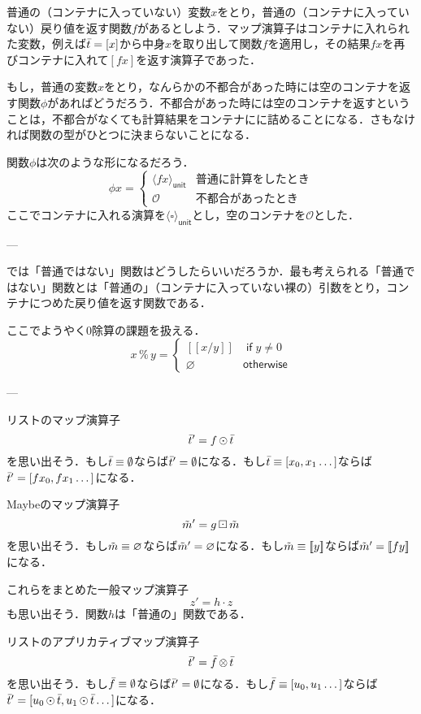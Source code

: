 \documentclass[a5paper,draft]{jsbook}
\def\[{\left[\!\left[}
\def\]{\right]\!\right]}
\newcommand{\mathListVar}[1]{\Bar{#1}}
\newcommand{\mathSomething}{\square}
\newcommand{\mathKeyword}[1]{\operatorname{\textsf{#1}}}
\newcommand{\mathIf}{\mathKeyword{if}}
\newcommand{\mathOtherwise}{\mathKeyword{otherwise}}
\DeclareMathOperator{\hsklApplicativeListMap}{\otimes}
\DeclareMathOperator{\hsklFmap}{\cdot}
\DeclareMathOperator{\hsklMap}{\odot}
\DeclareMathOperator{\hsklMaybeMap}{\boxdot}
\newcommand{\hsklEmptyList}{\emptyset}
\newcommand{\hsklNothing}{\varnothing}
\newcommand{\hsklJust}[1]{\[#1\]}
\newcommand{\hsklUnit}[1]{\langle#1\rangle_\textsf{unit}}
\newcommand{\hsklMaybe}[1]{\Tilde{#1}}
\begin{document}
普通の（コンテナに入っていない）変数$x$をとり，普通の（コンテナに入っていない）戻り値を返す関数$f$があるとしよう．マップ演算子はコンテナに入れられた変数，例えば$\mathListVar{t}=[x]$から中身$x$を取り出して関数$f$を適用し，その結果$fx$を再びコンテナに入れて$[fx]$を返す演算子であった．

もし，普通の変数$x$をとり，なんらかの不都合があった時には空のコンテナを返す関数$\phi$があればどうだろう．不都合があった時には空のコンテナを返すということは，不都合がなくても計算結果をコンテナにに詰めることになる．さもなければ関数の型がひとつに決まらないことになる．

関数$\phi$は次のような形になるだろう．
$$\phi x=\begin{cases}\hsklUnit{fx}&\text{普通に計算をしたとき}\\
\mathcal{O}&\text{不都合があったとき}\end{cases}$$
ここでコンテナに入れる演算を$\hsklUnit{\mathSomething}$とし，空のコンテナを$\mathcal{O}$とした．

---

では「普通ではない」関数はどうしたらいいだろうか．最も考えられる「普通ではない」関数とは「普通の」（コンテナに入っていない裸の）引数をとり，コンテナにつめた戻り値を返す関数である．

ここでようやく$0$除算の課題を扱える．
$$x\mathop{\%}y=\begin{cases}
\hsklJust{x/y}&\mathIf y\neq0\\
\hsklNothing&\mathOtherwise
\end{cases}
$$

---

リストのマップ演算子$$\mathListVar{t}'=f\hsklMap\mathListVar{t}$$を思い出そう．もし$\mathListVar{t}\equiv\hsklEmptyList$ならば$\mathListVar{t}'=\hsklEmptyList$になる．もし$\mathListVar{t}\equiv[x_0,x_1\dots]$ならば$\mathListVar{t}'=[fx_0,fx_1\dots]$になる．

Maybeのマップ演算子$$\hsklMaybe{m}'=g\hsklMaybeMap\hsklMaybe{m}$$を思い出そう．もし$\hsklMaybe{m}\equiv\hsklNothing$ならば$\hsklMaybe{m}'=\hsklNothing$になる．もし$\hsklMaybe{m}\equiv\hsklJust{y}$ならば$\hsklMaybe{m}'=\hsklJust{fy}$になる．

これらをまとめた一般マップ演算子$$z'=h\hsklFmap z$$も思い出そう．関数$h$は「普通の」関数である．

リストのアプリカティブマップ演算子$$\mathListVar{t}'=\mathListVar{f}\hsklApplicativeListMap\mathListVar{t}$$を思い出そう．もし$\mathListVar{f}\equiv\hsklEmptyList$ならば$\mathListVar{t}'=\hsklEmptyList$になる．もし$\mathListVar{f}\equiv[u_0,u_1\dots]$ならば$\mathListVar{t}'=[u_0\hsklMap\mathListVar{t},u_1\hsklMap\mathListVar{t}\dots]$になる．
\end{document}
